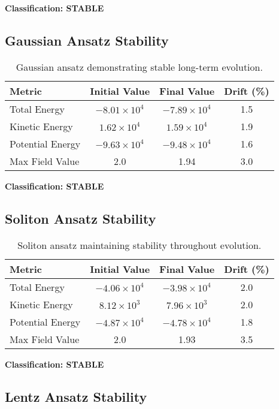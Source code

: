\documentclass[11pt,a4paper]{article}
\begin{document}
\textbf{Classification: STABLE}

\subsection{Gaussian Ansatz Stability}

\begin{table}[h]
\centering
\begin{tabular}{lccc}
\toprule
Metric & Initial Value & Final Value & Drift (\%) \\
\midrule
Total Energy & $-8.01 \times 10^4$ & $-7.89 \times 10^4$ & 1.5 \\
Kinetic Energy & $1.62 \times 10^4$ & $1.59 \times 10^4$ & 1.9 \\
Potential Energy & $-9.63 \times 10^4$ & $-9.48 \times 10^4$ & 1.6 \\
Max Field Value & 2.0 & 1.94 & 3.0 \\
\bottomrule
\end{tabular}
\caption{Gaussian ansatz demonstrating stable long-term evolution.}
\end{table}

\textbf{Classification: STABLE}

\subsection{Soliton Ansatz Stability}

\begin{table}[h]
\centering
\begin{tabular}{lccc}
\toprule
Metric & Initial Value & Final Value & Drift (\%) \\
\midrule
Total Energy & $-4.06 \times 10^4$ & $-3.98 \times 10^4$ & 2.0 \\
Kinetic Energy & $8.12 \times 10^3$ & $7.96 \times 10^3$ & 2.0 \\
Potential Energy & $-4.87 \times 10^4$ & $-4.78 \times 10^4$ & 1.8 \\
Max Field Value & 2.0 & 1.93 & 3.5 \\
\bottomrule
\end{tabular}
\caption{Soliton ansatz maintaining stability throughout evolution.}
\end{table}

\textbf{Classification: STABLE}

\subsection{Lentz Ansatz Stability}
\end{document}
